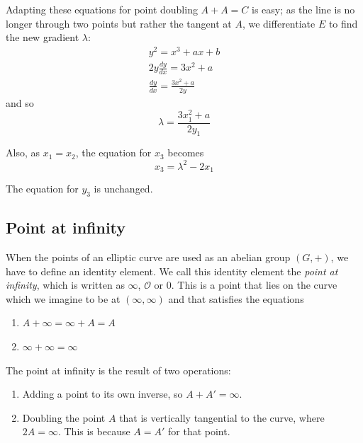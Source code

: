 \documentclass[a4paper]{article}
\begin{document}
Adapting these equations for point doubling $A + A = C$ is easy; as the line is no longer through two points but rather the tangent at $A$, we differentiate $E$ to find the new gradient $\lambda$:
\begin{align*}
    y^2 = x^3 + ax + b \\
    2y\frac{dy}{dx} = 3x^2 + a \\
    \frac{dy}{dx} = \frac{3x^2 + a}{2y}
\end{align*}
and so \[\lambda = \frac{3x_1^2 + a}{2y_1}\]

Also, as $x_1 = x_2$, the equation for $x_3$ becomes \[x_3 = \lambda^2-2x_1\]

The equation for $y_3$ is unchanged.

\subsection{Point at infinity}\label{poi}

When the points of an elliptic curve are used as an abelian group $(G, +)$, we have to define an identity element. We call this identity element the \textit{point at infinity}, which is written as $\infty$, $\mathcal{O}$ or $0$. This is a point that lies on the curve which we imagine to be at $(\infty, \infty)$ and that satisfies the equations
\begin{enumerate}
    \item $A + \infty = \infty + A = A$
    \item $\infty + \infty = \infty$\cite{guide}
\end{enumerate}

The point at infinity is the result of two operations:
\begin{enumerate}
    \item Adding a point to its own inverse, so $A + A' = \infty$.
    \item Doubling the point $A$ that is vertically tangential to the curve, where $2A = \infty$. This is because $A = A'$ for that point.
\end{enumerate}
\end{document}

